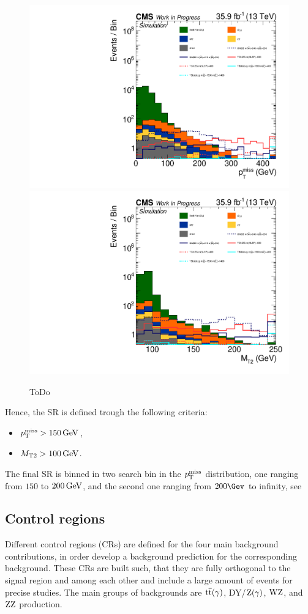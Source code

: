 \begin{figure}[tbp]
 \centering
 \includegraphics[width=\pairwidth]{figures/mt2/onZ_LL_met_log}
 \includegraphics[width=\pairwidth]{figures/mt2/onZ_LL_mt2_log}
 \caption{ToDo}
 \label{fig:SRvariables}
\end{figure}
Hence, the SR is defined trough the following criteria:
\begin{itemize}
 \item $p_{\mathrm{T}}^\text{miss}>150\,\text{Ge\hspace{-.08em}V}$,
 \item $M_{\mathrm{T2}}>100\,\text{Ge\hspace{-.08em}V}$.
\end{itemize}
The final SR is binned in two search bin in the $p_{\mathrm{T}}^\text{miss}$ distribution, one ranging from $150$ to $200\,\text{Ge\hspace{-.08em}V}$, and the second one ranging from $200\Gev$ to infinity, see 

\subsection{Control regions}\label{sec:CR}
Different control regions (CRs) are defined for the four main background contributions, in order develop a background prediction for the corresponding background. These CRs are built such, that they are fully orthogonal to the signal region and among each other and include a large amount of events for precise studies. The main groups of backgrounds are ${\mathrm{t}\overline{\mathrm{t}}}(\gamma)$, DY/$\mathrm{Z}(\gamma)$, $\mathrm{W}\mathrm{Z}$, and $\mathrm{Z}\mathrm{Z}$ production.

